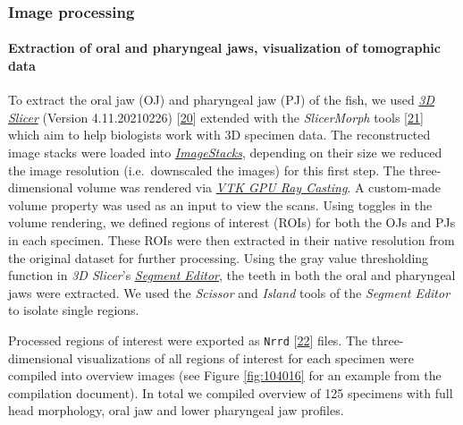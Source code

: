 \hypertarget{image-processing}{%
\subsubsection{Image processing}\label{image-processing}}

\hypertarget{extraction-of-oral-and-pharyngeal-jaws-visualization-of-tomographic-data}{%
\paragraph{Extraction of oral and pharyngeal jaws, visualization of tomographic data}\label{extraction-of-oral-and-pharyngeal-jaws-visualization-of-tomographic-data}}

To extract the oral jaw (OJ) and pharyngeal jaw (PJ) of the fish, we used \href{https://www.slicer.org}{\emph{3D Slicer}} (Version 4.11.20210226) {[}\protect\hyperlink{ref-OsCpHsJH}{20}{]} extended with the \emph{SlicerMorph} tools {[}\protect\hyperlink{ref-MwdN6kPV}{21}{]} which aim to help biologists work with 3D specimen data.
The reconstructed image stacks were loaded into \href{https://www.slicer.org/wiki/Documentation/Labs/ImageStacks}{\emph{ImageStacks}}, depending on their size we reduced the image resolution (i.e.~downscaled the images) for this first step.
The three-dimensional volume was rendered via \href{https://slicer.readthedocs.io/en/latest/user_guide/modules/volumerendering.html}{\emph{VTK GPU Ray Casting}}.
A custom-made volume property was used as an input to view the scans.
Using toggles in the volume rendering, we defined regions of interest (ROIs) for both the OJs and PJs in each specimen.
These ROIs were then extracted in their native resolution from the original dataset for further processing.
Using the gray value thresholding function in \emph{3D Slicer}'s \href{https://slicer.readthedocs.io/en/latest/user_guide/modules/segmenteditor.html}{\emph{Segment Editor}}, the teeth in both the oral and pharyngeal jaws were extracted.
We used the \emph{Scissor} and \emph{Island} tools of the \emph{Segment Editor} to isolate single regions.

Processed regions of interest were exported as \texttt{Nrrd} {[}\protect\hyperlink{ref-rn6XbmFW}{22}{]} files.
The three-dimensional visualizations of all regions of interest for each specimen were compiled into overview images (see Figure \ref{fig:104016} for an example from the compilation document).
In total we compiled overview of 125 specimens with full head morphology, oral jaw and lower pharyngeal jaw profiles.

